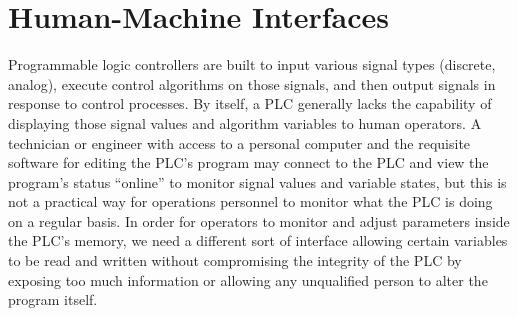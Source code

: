 \vskip 10pt
































\filbreak
\section{Human-Machine Interfaces}

Programmable logic controllers are built to input various signal types (discrete, analog), execute control algorithms on those signals, and then output signals in response to control processes.  By itself, a PLC generally lacks the capability of displaying those signal values and algorithm variables to human operators.  A technician or engineer with access to a personal computer and the requisite software for editing the PLC's program may connect to the PLC and view the program's status ``online'' to monitor signal values and variable states, but this is not a practical way for operations personnel to monitor what the PLC is doing on a regular basis.  In order for operators to monitor and adjust parameters inside the PLC's memory, we need a different sort of interface allowing certain variables to be read and written without compromising the integrity of the PLC by exposing too much information or allowing any unqualified person to alter the program itself.

